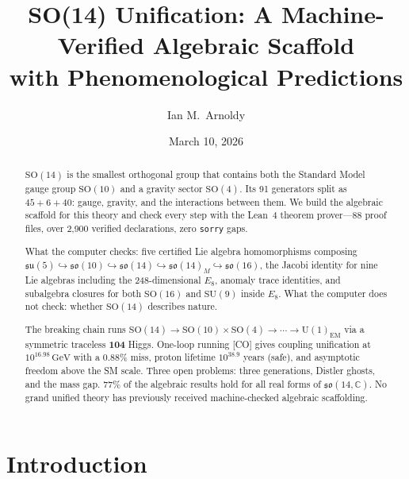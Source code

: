 \documentclass[aps,prd,twocolumn,showpacs,preprintnumbers,superscriptaddress,floatfix]{revtex4-2}
\newcommand{\so}{\mathfrak{so}}
\newcommand{\su}{\mathfrak{su}}
\newcommand{\GeV}{\,\mathrm{GeV}}
\begin{document}

\title{SO(14) Unification: A Machine-Verified Algebraic Scaffold \\
with Phenomenological Predictions}

\author{Ian M.~Arnoldy}

\date{March 10, 2026}

\begin{abstract}
$\mathrm{SO}(14)$ is the smallest orthogonal group that contains both the Standard Model
gauge group $\mathrm{SO}(10)$ and a gravity sector $\mathrm{SO}(4)$.  Its 91 generators
split as $45 + 6 + 40$: gauge, gravity, and the interactions between them.
We build the algebraic scaffold for this theory and check every step with the
Lean~4 theorem prover---88 proof files, over 2,900 verified declarations, zero
\texttt{sorry} gaps.

What the computer checks: five certified Lie algebra homomorphisms composing
$\su(5) \hookrightarrow \so(10) \hookrightarrow \so(14) \hookrightarrow \so(14)_M
\hookrightarrow \so(16)$, the Jacobi identity for nine Lie algebras including the
248-dimensional $E_8$, anomaly trace identities, and subalgebra closures for both
$\mathrm{SO}(16)$ and $\mathrm{SU}(9)$ inside $E_8$.
What the computer does not check: whether $\mathrm{SO}(14)$ describes nature.

The breaking chain runs $\mathrm{SO}(14) \to \mathrm{SO}(10) \times \mathrm{SO}(4)
\to \cdots \to \mathrm{U}(1)_\text{EM}$ via a symmetric traceless $\mathbf{104}$ Higgs.
One-loop running [CO] gives coupling unification at $10^{16.98}\GeV$ with a 0.88\%
miss, proton lifetime $10^{38.9}$ years (safe), and asymptotic freedom above the SM scale.
Three open problems: three generations, Distler ghosts, and the mass gap.
77\% of the algebraic results hold for all real forms of $\so(14,\mathbb{C})$.
No grand unified theory has previously received machine-checked algebraic scaffolding.
\end{abstract}


\maketitle

\section{Introduction}
\label{sec:intro}
\end{document}
